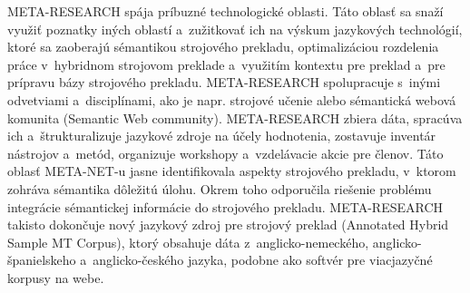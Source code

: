 META-RESEARCH spája príbuzné technologické oblasti. Táto oblasť sa snaží využiť poznatky iných oblastí a~zužitkovať ich na výskum jazykových technológií, ktoré sa zaoberajú sémantikou strojového prekladu, optimalizáciou rozdelenia práce v~hybridnom strojovom preklade a~využitím kontextu pre preklad a~pre prípravu bázy strojového prekladu. META-RESEARCH spolupracuje s~inými odvetviami a~disciplínami, ako je napr. strojové učenie alebo sémantická webová komunita (Semantic Web community). META-RESEARCH zbiera dáta, spracúva ich a~štrukturalizuje jazykové zdroje na účely hodnotenia, zostavuje inventár nástrojov a~metód, organizuje workshopy a~vzdelávacie akcie pre členov. Táto oblasť META-NET-u jasne identifikovala aspekty strojového prekladu, v~ktorom zohráva sémantika dôležitú úlohu. Okrem toho odporučila riešenie problému integrácie sémantickej informácie do strojového prekladu. META-RESEARCH takisto dokončuje nový jazykový zdroj pre strojový preklad (Annotated Hybrid Sample MT Corpus), ktorý obsahuje dáta z~anglicko-nemeckého, anglicko-španielskeho a~anglicko-českého jazyka, podobne ako softvér pre viacjazyčné korpusy na webe.
